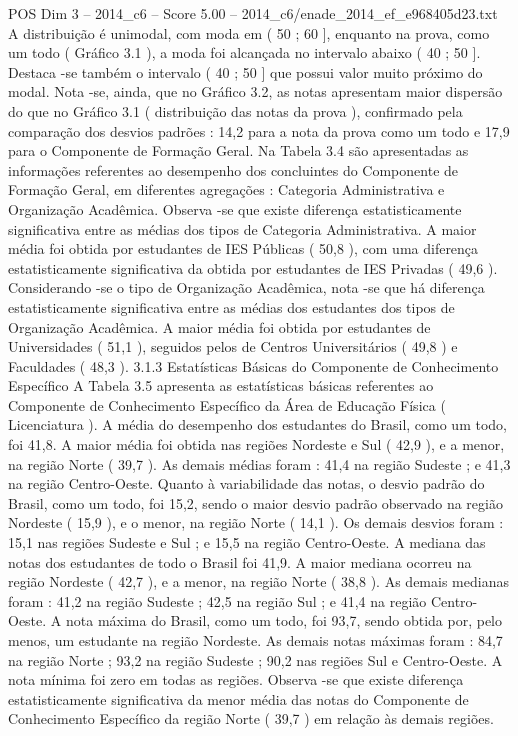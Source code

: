 \begin{textsample}{POS Dim 3 – 2014\_c6 – Score 5.00 – 2014\_c6/enade\_2014\_ef\_e968405d23.txt}
A distribuição é unimodal, com moda em ( 50 ; 60 ], enquanto na prova, como um todo ( Gráfico 3.1 ), a moda foi alcançada no intervalo abaixo ( 40 ; 50 ].
Destaca -se também o intervalo ( 40 ; 50 ] que possui valor muito próximo do modal.
Nota -se, ainda, que no Gráfico 3.2, as notas apresentam maior dispersão do que no Gráfico 3.1 ( distribuição das notas da prova ), confirmado pela comparação dos desvios padrões : 14,2 para a nota da prova como um todo e 17,9 para o Componente de Formação Geral.
Na Tabela 3.4 são apresentadas as informações referentes ao desempenho dos concluintes do Componente de Formação Geral, em diferentes agregações : Categoria Administrativa e Organização Acadêmica.
Observa -se que existe diferença estatisticamente significativa entre as médias dos tipos de Categoria Administrativa.
A maior média foi obtida por estudantes de IES Públicas ( 50,8 ), com uma diferença estatisticamente significativa da obtida por estudantes de IES Privadas ( 49,6 ).
Considerando -se o tipo de Organização Acadêmica, nota -se que há diferença estatisticamente significativa entre as médias dos estudantes dos tipos de Organização Acadêmica.
A maior média foi obtida por estudantes de Universidades ( 51,1 ), seguidos pelos de Centros Universitários ( 49,8 ) e Faculdades ( 48,3 ). 3.1.3 Estatísticas Básicas do Componente de Conhecimento Específico A Tabela 3.5 apresenta as estatísticas básicas referentes ao Componente de Conhecimento Específico da Área de Educação Física ( Licenciatura ).
A média do desempenho dos estudantes do Brasil, como um todo, foi 41,8.
A maior média foi obtida nas regiões Nordeste e Sul ( 42,9 ), e a menor, na região Norte ( 39,7 ).
As demais médias foram : 41,4 na região Sudeste ; e 41,3 na região Centro-Oeste.
Quanto à variabilidade das notas, o desvio padrão do Brasil, como um todo, foi 15,2, sendo o maior desvio padrão observado na região Nordeste ( 15,9 ), e o menor, na região Norte ( 14,1 ).
Os demais desvios foram : 15,1 nas regiões Sudeste e Sul ; e 15,5 na região Centro-Oeste.
A mediana das notas dos estudantes de todo o Brasil foi 41,9.
A maior mediana ocorreu na região Nordeste ( 42,7 ), e a menor, na região Norte ( 38,8 ).
As demais medianas foram : 41,2 na região Sudeste ; 42,5 na região Sul ; e 41,4 na região Centro-Oeste.
A nota máxima do Brasil, como um todo, foi 93,7, sendo obtida por, pelo menos, um estudante na região Nordeste.
As demais notas máximas foram : 84,7 na região Norte ; 93,2 na região Sudeste ; 90,2 nas regiões Sul e Centro-Oeste.
A nota mínima foi zero em todas as regiões.
Observa -se que existe diferença estatisticamente significativa da menor média das notas do Componente de Conhecimento Específico da região Norte ( 39,7 ) em relação às demais regiões.

\end{textsample}
